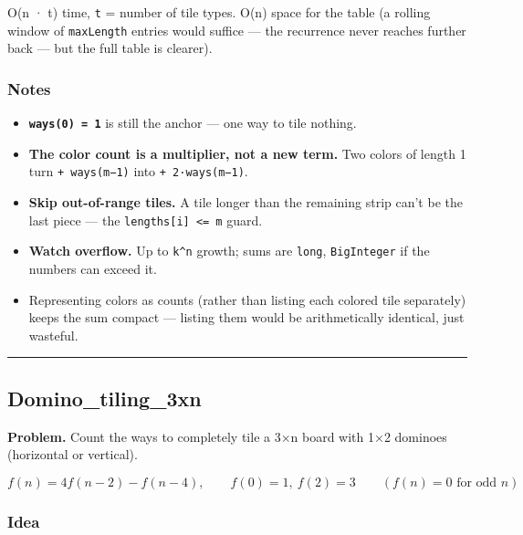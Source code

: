 \documentclass[
  10pt,
  letterpaper,
  onecolumn]{article}
\providecommand{\tightlist}{%
  \setlength{\itemsep}{0pt}\setlength{\parskip}{0pt}}
\begin{document}
O(n · t) time, \texttt{t} = number of tile types. O(n) space for the
table (a rolling window of \texttt{maxLength} entries would suffice ---
the recurrence never reaches further back --- but the full table is
clearer).

\hypertarget{notes-7}{%
\subsubsection{Notes}\label{notes-7}}

\begin{itemize}
\tightlist
\item
  \textbf{\texttt{ways(0)\ =\ 1}} is still the anchor --- one way to
  tile nothing.
\item
  \textbf{The color count is a multiplier, not a new term.} Two colors
  of length 1 turn \texttt{+\ ways(m−1)} into \texttt{+\ 2·ways(m−1)}.
\item
  \textbf{Skip out-of-range tiles.} A tile longer than the remaining
  strip can't be the last piece --- the
  \texttt{lengths{[}i{]}\ \textless{}=\ m} guard.
\item
  \textbf{Watch overflow.} Up to \texttt{k\^{}n} growth; sums are
  \texttt{long}, \texttt{BigInteger} if the numbers can exceed it.
\item
  Representing colors as counts (rather than listing each colored tile
  separately) keeps the sum compact --- listing them would be
  arithmetically identical, just wasteful.
\end{itemize}

\begin{center}\rule{0.5\linewidth}{0.5pt}\end{center}

\hypertarget{domino_tiling_3xn}{%
\subsection{Domino\_tiling\_3xn}\label{domino_tiling_3xn}}

\textbf{Problem.} Count the ways to completely tile a 3×n board with 1×2
dominoes (horizontal or vertical).

\begin{equation*}
f(n)=4f(n-2)-f(n-4),
\qquad f(0)=1,\ f(2)=3
\qquad (f(n)=0 \text{ for odd } n)
\end{equation*}

\hypertarget{idea-10}{%
\subsubsection{Idea}\label{idea-10}}
\end{document}
